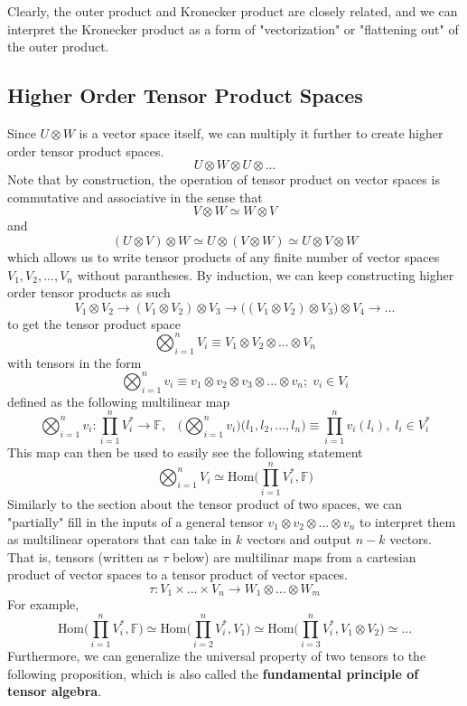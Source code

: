   Clearly, the outer product and Kronecker product are closely related, and we can interpret the Kronecker product as a form of "vectorization" or "flattening out" of the outer product. 

\subsection{Higher Order Tensor Product Spaces}

  Since $U \otimes W$ is a vector space itself, we can multiply it further to create higher order tensor product spaces. 
  \[U \otimes W \otimes U \otimes ...\]
  Note that by construction, the operation of tensor product on vector spaces is commutative and associative in the sense that 
  \[V \otimes W \simeq W \otimes V\]
  and 
  \[(U \otimes V) \otimes W \simeq U \otimes (V \otimes W) \simeq U \otimes V \otimes W \]
  which allows us to write tensor products of any finite number of vector spaces $V_1, V_2, ..., V_n$ without parantheses. By induction, we can keep constructing higher order tensor products as such 
  \[V_1 \otimes V_2 \rightarrow (V_1 \otimes V_2) \otimes V_3 \rightarrow \big((V_1 \otimes V_2) \otimes V_3 \big) \otimes V_4 \rightarrow ...\]
  to get the tensor product space
  \[\bigotimes_{i=1}^{n} V_{i} \equiv V_1 \otimes V_2 \otimes ... \otimes V_n\]
  with tensors in the form 
  \[ \bigotimes_{i=1}^{n} v_{i} \equiv v_{1} \otimes v_{2} \otimes v_{3} \otimes ... \otimes v_{n}; \; v_{i} \in V_{i}\]
  defined as the following multilinear map 
  \[ \bigotimes_{i=1}^{n} v_{i}: \prod_{i=1}^{n} V_{i}^{*} \longrightarrow \mathbb{F}, \;\;\; \bigg( \bigotimes_{i=1}^{n} v_{i} \bigg) \big( l_{1}, l_{2}, ..., l_{n} \big) \equiv \prod_{i=1}^{n} v_{i}(l_{i}), \; l_i \in V_i^* \]
  This map can then be used to easily see the following statement
  \[\bigotimes_{i=1}^n V_i \simeq \text{Hom}\Big( \prod_{i=1}^n V_i^*, \mathbb{F} \Big)\]
  Similarly to the section about the tensor product of two spaces, we can "partially" fill in the inputs of a general tensor $v_1 \otimes v_2 \otimes ... \otimes v_n$ to interpret them as multilinear operators that can take in $k$ vectors and output $n-k$ vectors. That is, tensors (written as $\tau$ below) are multilinar maps from a cartesian product of vector spaces to a tensor product of vector spaces. 
  \[\tau: V_1 \times ... \times V_n \longrightarrow W_1 \otimes ... \otimes W_m \]
  For example, 
  \[\text{Hom}\Big( \prod_{i=1}^n V_i^*, \mathbb{F} \Big) \simeq 
  \text{Hom}\Big( \prod_{i=2}^n V_i^*, V_1 \Big) \simeq 
  \text{Hom}\Big( \prod_{i=3}^n V_i^*, V_1 \otimes V_2 \Big) \simeq ... \]
  Furthermore, we can generalize the universal property of two tensors to the following proposition, which is also called the \textbf{fundamental principle of tensor algebra}. 

